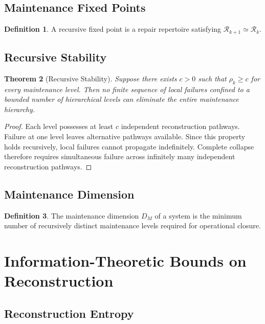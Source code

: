 \documentclass[12pt,oneside]{article}
\theoremstyle{plain}
\newtheorem{theorem}{Theorem}[section]
\theoremstyle{definition}
\newtheorem{definition}[theorem]{Definition}
\theoremstyle{remark}
\theoremstyle{plain}
\begin{document}
\subsection{Maintenance Fixed Points}

\begin{definition}
A recursive fixed point is a repair repertoire satisfying $\mathcal{R}_{k+1} \simeq \mathcal{R}_k$.
\end{definition}

\subsection{Recursive Stability}

\begin{theorem}[Recursive Stability]
Suppose there exists $c > 0$ such that $\rho_k \ge c$ for every maintenance level. Then no finite
sequence of local failures confined to a bounded number of hierarchical levels can eliminate the
entire maintenance hierarchy.
\end{theorem}

\begin{proof}
Each level possesses at least $c$ independent reconstruction pathways. Failure at one level leaves
alternative pathways available. Since this property holds recursively, local failures cannot
propagate indefinitely. Complete collapse therefore requires simultaneous failure across infinitely
many independent reconstruction pathways.
\end{proof}

\subsection{Maintenance Dimension}

\begin{definition}
The maintenance dimension $D_M$ of a system is the minimum number of recursively distinct
maintenance levels required for operational closure.
\end{definition}

\section{Information-Theoretic Bounds on Reconstruction}

\subsection{Reconstruction Entropy}
\end{document}
